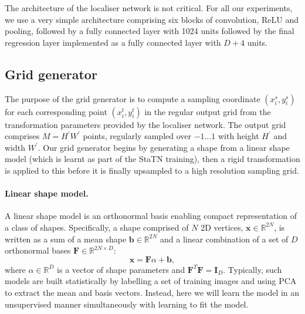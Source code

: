 \documentclass[runningheads]{llncs}
\newcommand{\R}{\mathbb{R}}
\begin{document}
The architecture of the localiser network is not critical. For all our experiments, we use a very simple architecture comprising six blocks of convolution, ReLU and pooling, followed by a fully connected layer with 1024 units followed by the final regression layer implemented as a fully connected layer with $D+4$ units.

\subsection{Grid generator}

The purpose of the grid generator is to compute a sampling coordinate $(x_i^s,y_i^s)$ for each corresponding point $(x_i^t,y_i^t)$ in the regular output grid from the transformation parameters provided by the localiser network. The output grid comprises $M=H^{\prime}W^{\prime}$ points, regularly sampled over $-1\dots 1$ with height $H^{\prime}$ and width $W^{\prime}$. Our grid generator begins by generating a shape from a linear shape model (which is learnt as part of the StaTN training), then a rigid transformation is applied to this before it is finally upsampled to a high resolution sampling grid.

\paragraph{Linear shape model.}
A linear shape model is an orthonormal basis enabling compact representation of a class of shapes. Specifically, a shape comprised of $N$ 2D vertices, $\mathbf{x}\in\R^{2N}$, is written as a sum of a mean shape $\mathbf{b}\in\R^{2N}$ and a linear combination of a set of $D$ orthonormal bases $\mathbf{F}\in\R^{2N\times D}$:
\begin{equation}
    \mathbf{x} = \mathbf{F}\alpha + \mathbf{b},\label{eqn:linshape}
\end{equation}
where $\alpha\in\R^D$ is a vector of shape parameters and $\mathbf{F}^T\mathbf{F}=\mathbf{I}_D$. Typically, such models are built statistically by labelling a set of training images and using PCA to extract the mean and basis vectors. Instead, here we will learn the model in an unsupervised manner simultaneously with learning to fit the model.
\end{document}
